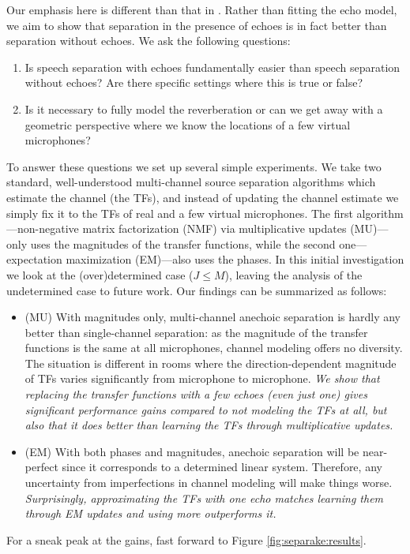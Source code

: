 Our emphasis here is different than that in .
Rather than fitting the echo model, we aim to show that separation in the presence of echoes is in fact better than separation without echoes.
We ask the following questions:
\begin{enumerate}
    \item Is speech separation with echoes fundamentally easier than speech separation without echoes?
    Are there specific settings where this is true or false?
    \item Is it necessary to fully model the reverberation or can we get away with a geometric perspective where we know the locations of a few virtual microphones?
\end{enumerate}
To answer these questions we set up several simple experiments.
We take two standard, well-understood multi-channel source separation algorithms which estimate the channel (the TFs),
and instead of updating the channel estimate we simply fix it to the TFs of real and a few virtual microphones.
The first algorithm---non-negative matrix factorization (NMF) via multiplicative updates (MU)---only uses the magnitudes of the transfer functions,
while the second one---expectation maximization (EM)---also uses the phases.
In this initial investigation we look at the (over)determined case ($J \leq M$),
leaving the analysis of the undetermined case to future work. Our findings can be summarized as follows:
\begin{itemize}
    \item (MU) With magnitudes only, multi-channel anechoic separation is hardly any better than single-channel separation:
    as the magnitude of the transfer functions is the same at all microphones, channel modeling offers no diversity.
    The situation is different in rooms where the direction-dependent magnitude of TFs varies significantly from microphone to microphone.
    \textit{We show that replacing the transfer functions with a few echoes (even just one) gives significant performance gains compared to not modeling the TFs at all,
    but also that it does better than learning the TFs through multiplicative updates.}
    \item (EM) With both phases and magnitudes, anechoic separation will be near-perfect since it corresponds to a determined linear system.
    Therefore, any uncertainty from imperfections in channel modeling will make things worse.
    \textit{Surprisingly, approximating the TFs with one echo matches learning them through EM updates and using more outperforms it.}
\end{itemize}
For a sneak peak at the gains, fast forward to Figure \ref{fig:separake:results}.


